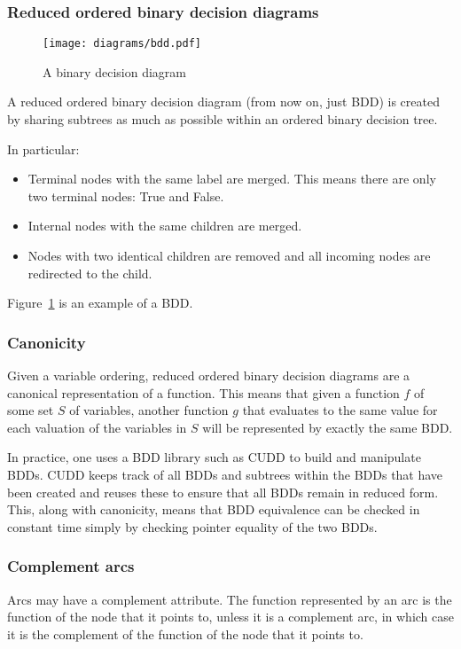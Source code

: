 \subsubsection{Reduced ordered binary decision diagrams}

\begin{figure}[t]
\centering
\texttt{[image: diagrams/bdd.pdf]}
\caption{A binary decision diagram}
\label{fig:bdd}
\end{figure}

A reduced ordered binary decision diagram (from now on, just BDD) is created by sharing subtrees as much as possible within an ordered binary decision tree.

In particular: 
\begin{itemize}
    \item Terminal nodes with the same label are merged. This means there are only two terminal nodes: True and False.
    \item Internal nodes with the same children are merged.
    \item Nodes with two identical children are removed and all incoming nodes are redirected to the child.
\end{itemize}

Figure~\ref{fig:bdd} is an example of a BDD.

\subsubsection{Canonicity}
Given a variable ordering, reduced ordered binary decision diagrams are a canonical representation of a function. This means that given a function $f$ of some set $S$ of variables, another function $g$ that evaluates to the same value for each valuation of the variables in $S$ will be represented by exactly the same BDD.

In practice, one uses a BDD library such as CUDD \cite{cudd} to build and manipulate BDDs. CUDD keeps track of all BDDs and subtrees within the BDDs that have been created and reuses these to ensure that all BDDs remain in reduced form. This, along with canonicity, means that BDD equivalence can be checked in constant time simply by checking pointer equality of the two BDDs.

\subsubsection{Complement arcs}

Arcs may have a complement attribute. The function represented by an arc is the function of the node that it points to, unless it is a complement arc, in which case it is the complement of the function of the node that it points to.

